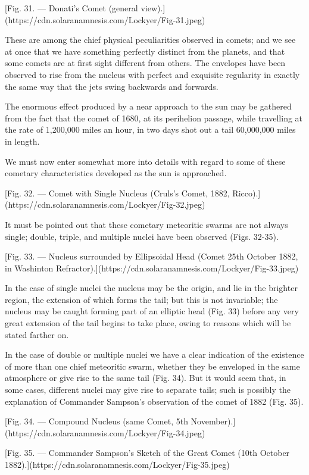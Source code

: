 \documentclass[a4paper, 12pt, oneside, polutonikogreek, english]{article}
\begin{document}
[Fig. 31. --- Donati's Comet (general view).](https://cdn.solaranamnesis.com/Lockyer/Fig-31.jpeg)

These are among the chief physical peculiarities observed in comets; and we see at once that we have something perfectly distinct from the planets, and that some comets are at first sight different from others. The envelopes have been observed to rise from the nucleus with perfect and exquisite regularity in exactly the same way that the jets swing backwards and forwards.

The enormous effect produced by a near approach to the sun may be gathered from the fact that the comet of 1680, at its perihelion passage, while travelling at the rate of 1,200,000 miles an hour, in two days shot out a tail 60,000,000 miles in length.

We must now enter somewhat more into details with regard to some of these cometary characteristics developed as the sun is approached.

[Fig. 32. --- Comet with Single Nucleus (Cruls's Comet, 1882, Ricco).](https://cdn.solaranamnesis.com/Lockyer/Fig-32.jpeg)

It must be pointed out that these cometary meteoritic swarms are not always single; double, triple, and multiple nuclei have been observed (Figs. 32-35).

[Fig. 33. --- Nucleus surrounded by Ellipsoidal Head (Comet 25th October 1882, in Washinton Refractor).](https://cdn.solaranamnesis.com/Lockyer/Fig-33.jpeg)

In the case of single nuclei the nucleus may be the origin, and lie in the brighter region, the extension of which forms the tail; but this is not invariable; the nucleus may be caught forming part of an elliptic head (Fig. 33) before any very great extension of the tail begins to take place, owing to reasons which will be stated farther on.

In the case of double or multiple nuclei we have a clear indication of the existence of more than one chief meteoritic swarm, whether they be enveloped in the same atmosphere or give rise to the same tail (Fig. 34). But it would seem that, in some cases, different nuclei may give rise to separate tails; such is possibly the explanation of Commander Sampson's observation of the comet of 1882 (Fig. 35).

[Fig. 34. --- Compound Nucleus (same Comet, 5th November).](https://cdn.solaranamnesis.com/Lockyer/Fig-34.jpeg)

[Fig. 35. --- Commander Sampson's Sketch of the Great Comet (10th October 1882).](https://cdn.solaranamnesis.com/Lockyer/Fig-35.jpeg)
\end{document}
